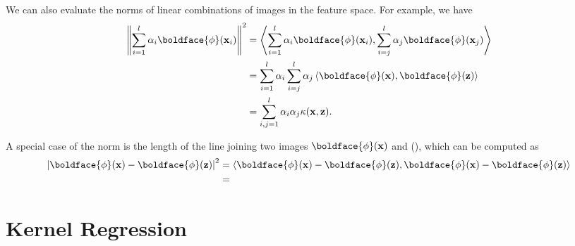 We can also evaluate the norms of linear combinations of images in the feature space. For example, we have 
\begin{align*}
	\left\|\sum_{i=1}^l\alpha_i\boldface{\phi}(\rvx_i)\right\|^2 &= \left<\sum_{i=1}^l\alpha_i\boldface{\phi}(\rvx_i), \sum_{i=j}^l\alpha_j\boldface{\phi}(\rvx_j)\right>\\
																 &=\sum_{i=1}^l\alpha_i\sum_{i=j}^l\alpha_j \left<\boldface{\phi}(\rvx), \boldface{\phi}(\rvz)\right>\\
																 &= \sum_{i,j=1}^l \alpha_i\alpha_j \kappa(\rvx, \rvz). 
\end{align*}

A special case of the norm is the length of the line joining two images $\boldface{\phi}(\rvx)$ and \boldface{\phi}(\rvz), which can be computed as
\begin{align*}
	\left|\boldface{\phi}(\rvx)-\boldface{\phi}(\rvz)\right|^2 &= \left<\boldface{\phi}(\rvx)-\boldface{\phi}(\rvz), \boldface{\phi}(\rvx)-\boldface{\phi}(\rvz)\right>\\
															   &= 
\end{align*}






\section{Kernel Regression}


